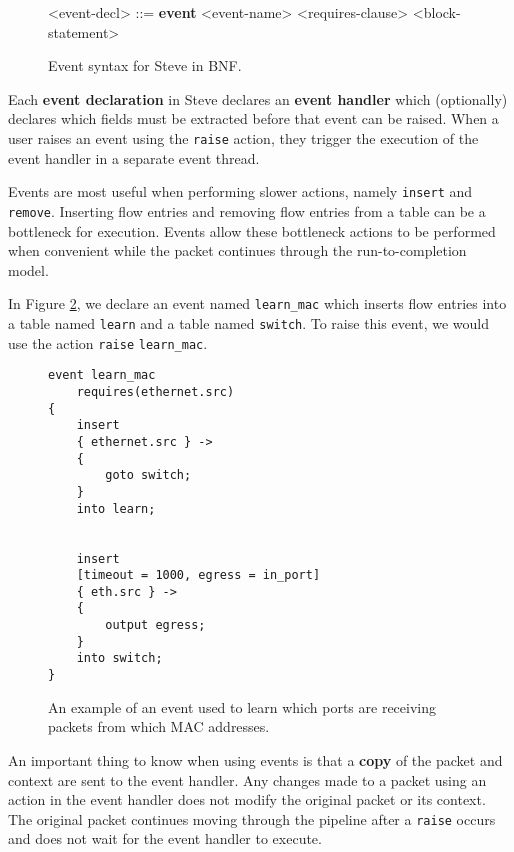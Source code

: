\begin{figure}[ht]
\begin{mdframed}
\begin{grammar}

<event-decl> ::=
\textbf{event} <event-name> <requires-clause> 
<block-statement>

\end{grammar}
\end{mdframed}
\caption{Event syntax for Steve in BNF.}
\label{fg:event_syntax}
\end{figure}

Each \textbf{event declaration} in Steve declares an \textbf{event handler} which (optionally) declares which fields must be extracted before that event can be raised. When a user raises an event using the \texttt{raise} action, they trigger the execution of the event handler in a separate event thread.

Events are most useful when performing slower actions, namely \texttt{insert} and \texttt{remove}. Inserting flow entries and removing flow entries from a table can be a bottleneck for execution. Events allow these bottleneck actions to be performed when convenient while the packet continues through the run-to-completion model.

In Figure \ref{fg:event_ex}, we declare an event named \texttt{learn\_mac} which inserts flow entries into a table named \texttt{learn} and a table named \texttt{switch}. To raise this event, we would use the action \texttt{\color{blue}raise} \texttt{learn\_mac}. 

\begin{figure}[ht]
\begin{lstlisting}
event learn_mac
	requires(ethernet.src)
{
	insert
	{ ethernet.src } ->
	{
		goto switch;
	}
	into learn;


	insert
	[timeout = 1000, egress = in_port]
	{ eth.src } ->
	{
		output egress;
	}
	into switch;
}
\end{lstlisting}
\caption{An example of an event used to learn which ports are receiving packets from which MAC addresses.}
\label{fg:event_ex}
\end{figure}

An important thing to know when using events is that a \textbf{copy} of the packet and context are sent to the event handler. Any changes made to a packet using an action in the event handler does not modify the original packet or its context. The original packet continues moving through the pipeline after a \texttt{raise} occurs and does not wait for the event handler to execute.

